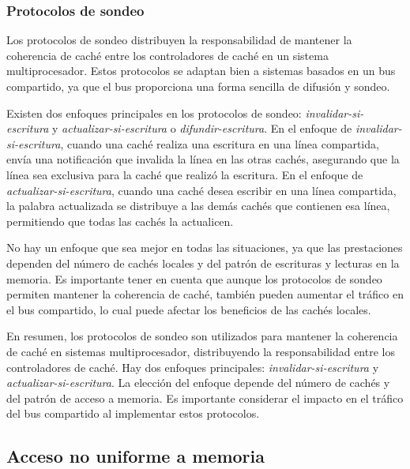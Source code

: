  \subsubsection{Protocolos de sondeo}

 Los protocolos de sondeo distribuyen la responsabilidad de mantener la coherencia de caché entre los controladores de caché en un sistema multiprocesador. Estos protocolos se adaptan bien a sistemas basados en un bus compartido, ya que el bus proporciona una forma sencilla de difusión y sondeo.

Existen dos enfoques principales en los protocolos de sondeo: \textit{invalidar-si-escritura} y \textit{actualizar-si-escritura} o \textit{difundir-escritura}. En el enfoque de \textit{invalidar-si-escritura}, cuando una caché realiza una escritura en una línea compartida, envía una notificación que invalida la línea en las otras cachés, asegurando que la línea sea exclusiva para la caché que realizó la escritura. En el enfoque de \textit{actualizar-si-escritura}, cuando una caché desea escribir en una línea compartida, la palabra actualizada se distribuye a las demás cachés que contienen esa línea, permitiendo que todas las cachés la actualicen.

No hay un enfoque que sea mejor en todas las situaciones, ya que las prestaciones dependen del número de cachés locales y del patrón de escrituras y lecturas en la memoria. Es importante tener en cuenta que aunque los protocolos de sondeo permiten mantener la coherencia de caché, también pueden aumentar el tráfico en el bus compartido, lo cual puede afectar los beneficios de las cachés locales.

En resumen, los protocolos de sondeo son utilizados para mantener la coherencia de caché en sistemas multiprocesador, distribuyendo la responsabilidad entre los controladores de caché. Hay dos enfoques principales: \textit{invalidar-si-escritura} y \textit{actualizar-si-escritura}. La elección del enfoque depende del número de cachés y del patrón de acceso a memoria. Es importante considerar el impacto en el tráfico del bus compartido al implementar estos protocolos.

\subsection{Acceso no uniforme a memoria}

